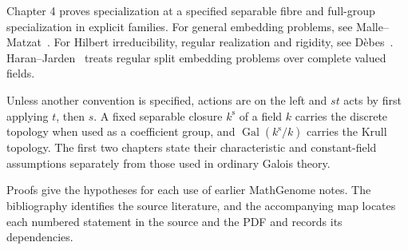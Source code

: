 \documentclass[11pt,oneside,openany]{book}
\theoremstyle{definition}
\theoremstyle{remark}
\begin{document}
Chapter 4 proves specialization at a specified separable fibre and
full-group specialization in explicit families. For general
embedding problems, see Malle--Matzat~\cite[Chapter IV, Sections 1--2]{mallematzat}.
For Hilbert irreducibility, regular realization and rigidity, see
D\`ebes~\cite[Sections 5.2--5.3 and 8.2]{debes}.
Haran--Jarden~\cite[Sections 1 and 5]{haranjarden} treats regular split
embedding problems over complete valued fields.

Unless another convention is specified, actions are on the left and
\(st\) acts by first applying \(t\), then \(s\). A fixed separable
closure \(k^{\mathrm s}\) of a field \(k\) carries the discrete topology
when used as a coefficient group, and
\(\operatorname{Gal}(k^{\mathrm s}/k)\) carries the Krull topology.
The first two chapters state their characteristic and constant-field
assumptions separately from those used in ordinary Galois theory.

Proofs give the hypotheses for each use of earlier MathGenome notes.
The bibliography identifies the source literature, and the accompanying
map locates each numbered statement in the source and the PDF and records
its dependencies.

\mainmatter




\backmatter

\end{document}
